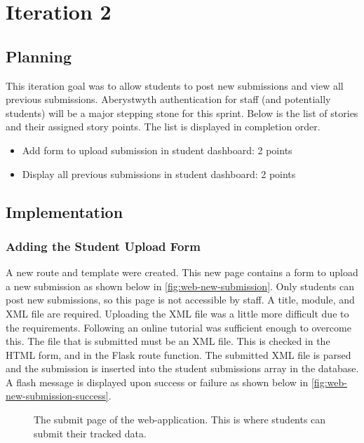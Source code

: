 \chapter{Iteration 2}
\section{Planning}
This iteration goal was to allow students to post new submissions and view all previous submissions. Aberystwyth authentication for staff (and potentially students) will be a major stepping stone for this sprint. Below is the list of stories and their assigned story points. The list is displayed in completion order.

\begin{itemize}
\item Add form to upload submission in student dashboard: 2 points
\item Display all previous submissions in student dashboard: 2 points
\end{itemize}

\section{Implementation}
\subsection{Adding the Student Upload Form}
A new route and template were created. This new page contains a form to upload a new submission as shown below in \autoref{fig:web-new-submission}. Only students can post new submissions, so this page is not accessible by staff. A title, module, and XML file are required. Uploading the XML file was a little more difficult due to the requirements. Following an online tutorial was sufficient enough to overcome this\cite{FlaskUploadingFiles}. The file that is submitted must be an XML file. This is checked in the HTML form, and in the Flask route function. The submitted XML file is parsed and the submission is inserted into the student submissions array in the database. A flash message is displayed upon success or failure as shown below in \autoref{fig:web-new-submission-success}.

\begin{figure}[H]
  \centering
  \caption[Web New Submission Page]{The submit page of the web-application. This is where students can submit their tracked data.}
  \label{fig:web-new-submission}
\end{figure}

